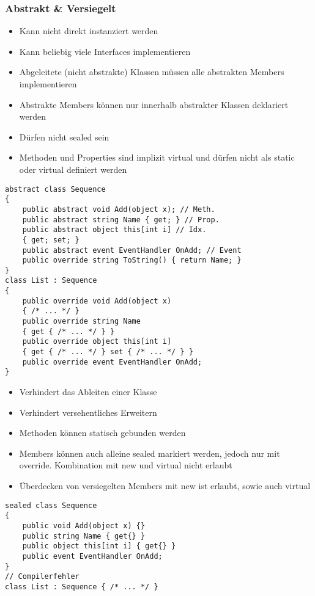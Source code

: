 \begin{multicols*}{2}
\subsubsection{Abstrakt \& Versiegelt}
\begin{itemize}
    \item Kann nicht direkt instanziert werden
    \item Kann beliebig viele Interfaces implementieren
    \item Abgeleitete (nicht abstrakte) Klassen müssen alle abstrakten Members implementieren
    \item Abstrakte Members können nur innerhalb abstrakter Klassen deklariert werden
    \item Dürfen nicht sealed sein
    \item Methoden und Properties sind implizit virtual und dürfen nicht als static oder virtual definiert werden
\end{itemize}
\begin{lstlisting}
abstract class Sequence
{
    public abstract void Add(object x); // Meth. 
    public abstract string Name { get; } // Prop. 
    public abstract object this[int i] // Idx. 
    { get; set; }
    public abstract event EventHandler OnAdd; // Event
    public override string ToString() { return Name; }
}
class List : Sequence
{
    public override void Add(object x)
    { /* ... */ }
    public override string Name
    { get { /* ... */ } }
    public override object this[int i]
    { get { /* ... */ } set { /* ... */ } } 
    public override event EventHandler OnAdd;
}
\end{lstlisting}
\begin{itemize}
    \item Verhindert das Ableiten einer Klasse
    \item Verhindert versehentliches Erweitern
    \item Methoden können statisch gebunden werden
    \item Members können auch alleine sealed markiert werden, jedoch nur mit override. Kombination mit new und virtual nicht erlaubt
    \item Überdecken von versiegelten Members mit new ist erlaubt, sowie auch virtual
\end{itemize}
\begin{lstlisting}
sealed class Sequence 
{
    public void Add(object x) {}
    public string Name { get{} }
    public object this[int i] { get{} }
    public event EventHandler OnAdd;
}
// Compilerfehler
class List : Sequence { /* ... */ }


\end{lstlisting}
\end{multicols*}
